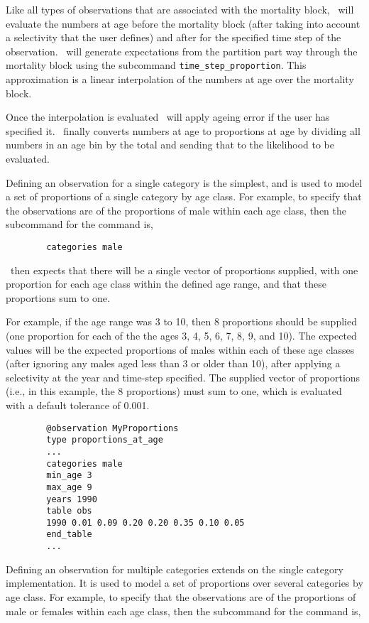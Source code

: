 Like all types of observations that are associated with the mortality block, \CNAME\ will evaluate the numbers at age before the mortality block (after taking into account a selectivity that the user defines) and after for the specified time step of the observation. \CNAME\ will generate expectations from the partition part way through the mortality block using the subcommand \texttt{time\_step\_proportion}. This approximation is a linear interpolation of the numbers at age over the mortality block. 

Once the interpolation is evaluated \CNAME\ will apply ageing error if the user has specified it. \CNAME\ finally converts numbers at age to proportions at age by dividing all numbers in an age bin by the total and sending that to the likelihood to be evaluated.

Defining an observation for a single category is the simplest, and is used to model a set of proportions of a single category by age class. For example, to specify that the observations are of the proportions of male within each age class, then the subcommand  for the  command is,

{\small{\begin{verbatim}
		categories male
		\end{verbatim}}}

\CNAME\ then expects that there will be a single vector of proportions supplied, with one proportion for each age class within the defined age range, and that these proportions sum to one. 

For example, if the age range was 3 to 10, then 8 proportions should be supplied (one proportion for each of the the ages 3, 4, 5, 6, 7, 8, 9, and 10). The expected values will be the expected proportions of males within each of these age classes (after ignoring any males aged less than 3 or older than 10), after applying a selectivity at the year and time-step specified. The supplied vector of proportions (i.e., in this example, the 8 proportions) must sum to one, which is evaluated with a default tolerance of 0.001. 


{\small{\begin{verbatim}
		@observation MyProportions
		type proportions_at_age
		...
		categories male
		min_age 3
		max_age 9
		years 1990
		table obs
		1990 0.01 0.09 0.20 0.20 0.35 0.10 0.05
		end_table
		...
		\end{verbatim}}}


Defining an observation for multiple categories extends on the single category implementation. It is used to model a set of proportions over several categories by age class. For example, to specify that the observations are of the proportions of male or females within each age class, then the subcommand  for the  command is,

